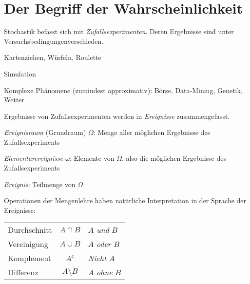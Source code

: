 \chapter{Der Begriff der Wahrscheinlichkeit}
\label{kap1}
Stochastik befasst sich mit \emph{Zufallsexperimenten}. Deren Ergebnisse sind unter \glqq Versuchsbedingungen\grqq verschieden.
\begin{bspl}
	\begin{compactitem}
		\item Kartenziehen, Würfeln, Roulette
		\item Simulation
		\item Komplexe Phänomene (zumindest approximativ): Börse, Data-Mining, Genetik, Wetter
	\end{compactitem}
\end{bspl}
Ergebnisse von Zufallsexperimenten werden in \emph{Ereignisse} zusammengefasst.
\begin{compactitem}
	\item \emph{Ereignisraum} (Grundraum) $\Omega$: Menge aller möglichen Ergebnisse des Zufallsexperiments
	\item \emph{Elementarereignisse $\omega$}: Elemente von $\Omega$, also die möglichen Ergebnisse des Zufallsexperiments
	\item \emph{Ereignis}: Teilmenge von $\Omega$
	\item Operationen der Mengenlehre haben natürliche Interpretation in der Sprache der Ereignisse:\\[-1em]
		\begin{center}
				\begin{tabular}{lcl}
					\toprule
					Durchschnitt	& $A\cap B$			& $A$ \emph{und} $B$	\\
					Vereinigung		& $A\cup B$			& $A$ \emph{oder} $B$	\\
					Komplement		& $A^c$				& \emph{Nicht} $A$	\\
					Differenz		& $A\setminus B$	& $A$ \emph{ohne} $B$ \\
					\bottomrule
				\end{tabular}
		\end{center}
\end{compactitem}

